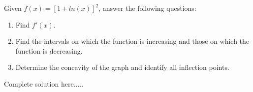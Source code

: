 \begin{example}
Given $f(x)=[1+ln(x)]^2$, answer the following questions:
\renewcommand{\labelenumi}{\textbf{(\alph{enumi})}}
\begin{enumerate}[leftmargin=*]
    \item Find $f'(x)$.
    \item Find the intervals on which the function is increasing and those on which the function is decreasing.
    \item Determine the concavity of the graph and identify all inflection points.
\end{enumerate}
    \begin{sol}
    \end{sol}
    \begin{solL}
    Complete solution here.....
    
    \end{solL}
    
\end{example}
\newpage
